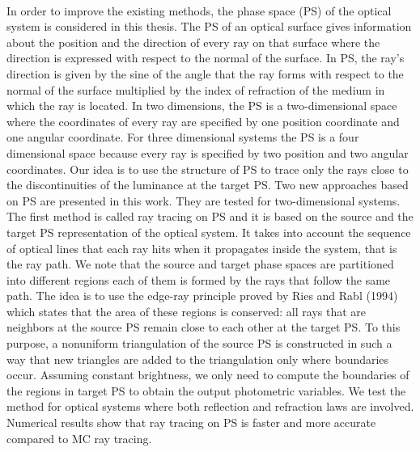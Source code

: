 \\ \indent
In order to improve the existing methods, the phase space (PS) of the optical system is considered in this thesis. The PS of an optical surface gives information about the position and the direction of every ray on that surface where the direction is expressed with respect to the normal of the surface. In PS, the ray's direction is given by the sine of the angle that the ray forms with respect to the normal of the surface multiplied by the index of refraction of the medium in which the ray is located.
In two dimensions, the PS is a two-dimensional space where the coordinates of every ray are specified by one position coordinate and one angular coordinate. 
For three dimensional systems the PS is a four dimensional space because every ray is specified by two position and two angular coordinates. Our idea is to use the structure of PS to trace only the rays close to the discontinuities of the luminance at the target PS.
Two new approaches based on PS are presented in this work. They are tested for two-dimensional systems. 
\\ \indent The first method is called ray tracing on PS and it is based on the source and the target PS representation of the optical system. It takes into account the sequence of optical lines that each ray hits when it propagates inside the system, that is the ray path. We note that the source and target phase spaces are partitioned into different regions each of them is formed by the rays that follow the same path. The idea is to use the edge-ray principle proved by Ries and Rabl (1994) which states that the area of these regions is conserved: all rays that are neighbors at the source PS remain close to each other at the target PS. To this purpose, a nonuniform triangulation of the source PS is constructed in such a way that new triangles are added to the triangulation only where boundaries occur. 
Assuming constant brightness, we only need to compute the boundaries of the regions in target PS to obtain the output photometric variables. 
We test the method for optical systems where both reflection and refraction laws are involved.
 Numerical results show that ray tracing on PS is faster and more accurate compared to MC ray tracing.

